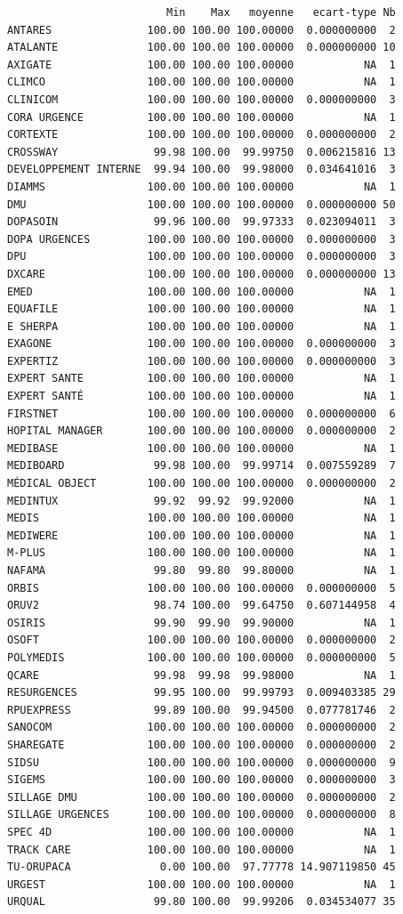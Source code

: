 \documentclass[]{article}
\begin{document}
\begin{verbatim}
                         Min    Max   moyenne   ecart-type Nb
ANTARES               100.00 100.00 100.00000  0.000000000  2
ATALANTE              100.00 100.00 100.00000  0.000000000 10
AXIGATE               100.00 100.00 100.00000           NA  1
CLIMCO                100.00 100.00 100.00000           NA  1
CLINICOM              100.00 100.00 100.00000  0.000000000  3
CORA URGENCE          100.00 100.00 100.00000           NA  1
CORTEXTE              100.00 100.00 100.00000  0.000000000  2
CROSSWAY               99.98 100.00  99.99750  0.006215816 13
DEVELOPPEMENT INTERNE  99.94 100.00  99.98000  0.034641016  3
DIAMMS                100.00 100.00 100.00000           NA  1
DMU                   100.00 100.00 100.00000  0.000000000 50
DOPASOIN               99.96 100.00  99.97333  0.023094011  3
DOPA URGENCES         100.00 100.00 100.00000  0.000000000  3
DPU                   100.00 100.00 100.00000  0.000000000  3
DXCARE                100.00 100.00 100.00000  0.000000000 13
EMED                  100.00 100.00 100.00000           NA  1
EQUAFILE              100.00 100.00 100.00000           NA  1
E SHERPA              100.00 100.00 100.00000           NA  1
EXAGONE               100.00 100.00 100.00000  0.000000000  3
EXPERTIZ              100.00 100.00 100.00000  0.000000000  3
EXPERT SANTE          100.00 100.00 100.00000           NA  1
EXPERT SANTÉ          100.00 100.00 100.00000           NA  1
FIRSTNET              100.00 100.00 100.00000  0.000000000  6
HOPITAL MANAGER       100.00 100.00 100.00000  0.000000000  2
MEDIBASE              100.00 100.00 100.00000           NA  1
MEDIBOARD              99.98 100.00  99.99714  0.007559289  7
MÉDICAL OBJECT        100.00 100.00 100.00000  0.000000000  2
MEDINTUX               99.92  99.92  99.92000           NA  1
MEDIS                 100.00 100.00 100.00000           NA  1
MEDIWERE              100.00 100.00 100.00000           NA  1
M-PLUS                100.00 100.00 100.00000           NA  1
NAFAMA                 99.80  99.80  99.80000           NA  1
ORBIS                 100.00 100.00 100.00000  0.000000000  5
ORUV2                  98.74 100.00  99.64750  0.607144958  4
OSIRIS                 99.90  99.90  99.90000           NA  1
OSOFT                 100.00 100.00 100.00000  0.000000000  2
POLYMEDIS             100.00 100.00 100.00000  0.000000000  5
QCARE                  99.98  99.98  99.98000           NA  1
RESURGENCES            99.95 100.00  99.99793  0.009403385 29
RPUEXPRESS             99.89 100.00  99.94500  0.077781746  2
SANOCOM               100.00 100.00 100.00000  0.000000000  2
SHAREGATE             100.00 100.00 100.00000  0.000000000  2
SIDSU                 100.00 100.00 100.00000  0.000000000  9
SIGEMS                100.00 100.00 100.00000  0.000000000  3
SILLAGE DMU           100.00 100.00 100.00000  0.000000000  2
SILLAGE URGENCES      100.00 100.00 100.00000  0.000000000  8
SPEC 4D               100.00 100.00 100.00000           NA  1
TRACK CARE            100.00 100.00 100.00000           NA  1
TU-ORUPACA              0.00 100.00  97.77778 14.907119850 45
URGEST                100.00 100.00 100.00000           NA  1
URQUAL                 99.80 100.00  99.99206  0.034534077 35
\end{verbatim}
\end{document}
